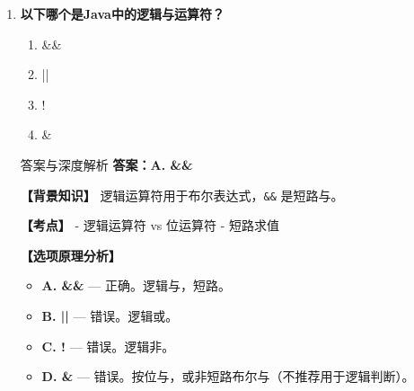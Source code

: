 \documentclass[12pt, a4paper]{ctexart} %
\newcommand{\code}[1]{\texttt{#1}}
\begin{document}
\begin{enumerate}[label=\textbf{\arabic*.}]
\begin{bluebox}{答案与深度解析}
		      \textbf{【考点】}
		      - 整数除法 vs 浮点除法
		      - 类型转换

		      \textbf{【选项原理分析】}
		      \begin{itemize}[leftmargin=*]
			      \item \textbf{A. 2.5} — 错误。这是数学结果，但Java整数除法不保留小数。
			      \item \textbf{B. 2} — 正确。\code{5\ /\ 2\ =\ 2}（截断）。
			      \item \textbf{C. 3} — 错误。不是四舍五入。
			      \item \textbf{D. 2.0} — 错误。输出是整数 \code{2}，不是浮点数。
		      \end{itemize}

		      \textbf{【应背诵知识点】}
		      \begin{enumerate}
			      \item 整数除法：截断小数
			      \item 得到浮点结果：\code{a\ /\ (double)\ b}
			      \item 取模：\code{a\ \%\ b} 得余数
		      \end{enumerate}
	      \end{bluebox}

	      \vspace{1em}

	\item \textbf{以下哪个是Java中的逻辑与运算符？}
	      \begin{enumerate}[label=\Alph*.]
		      \item \&\&
		      \item ||
		      \item !
		      \item \&
	      \end{enumerate}

	      \begin{bluebox}{答案与深度解析}
		      \textbf{答案：A. \&\&}

		      \textbf{【背景知识】}
		      逻辑运算符用于布尔表达式，\code{\&\&} 是短路与。

		      \textbf{【考点】}
		      - 逻辑运算符 vs 位运算符
		      - 短路求值

		      \textbf{【选项原理分析】}
		      \begin{itemize}[leftmargin=*]
			      \item \textbf{A. \&\&} — 正确。逻辑与，短路。
			      \item \textbf{B. ||} — 错误。逻辑或。
			      \item \textbf{C. !} — 错误。逻辑非。
			      \item \textbf{D. \&} — 错误。按位与，或非短路布尔与（不推荐用于逻辑判断）。
		      \end{itemize}


\end{bluebox}
\end{enumerate}
\end{document}
